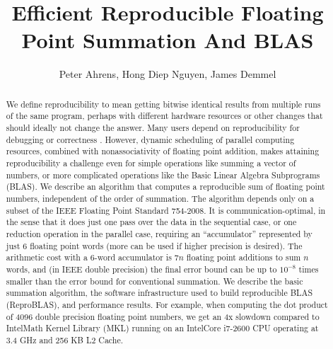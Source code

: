\documentclass[12pt]{article}
\author{Peter Ahrens, Hong Diep Nguyen, James Demmel}
\title{Efficient Reproducible Floating Point Summation And BLAS}
\theoremstyle{definition}
\numberwithin{equation}{section}
\numberwithin{figure}{section}
\begin{document}
\noindent
\maketitle
\begin{abstract}
We define reproducibility to mean getting bitwise identical results from
multiple runs of the same program, perhaps with different hardware resources or other
changes that should ideally not change the answer. Many users depend on reproducibility
for debugging or correctness \cite{reproducibilityBOF}. However, dynamic scheduling of parallel computing
resources, combined with nonassociativity of floating point addition, makes attaining
reproducibility a challenge even for simple operations like summing a vector of numbers,
or more complicated operations like the Basic Linear Algebra Subprograms (BLAS).
We describe an algorithm that computes a reproducible sum of floating point numbers,
independent of the order of summation. The algorithm depends only on a subset of
the IEEE Floating Point Standard 754-2008. It is communication-optimal, in the sense that
it does just one pass over the data in the sequential case, or one reduction operation in
the parallel case, requiring an ``accumulator'' represented by just 6 floating point words
(more can be used if higher precision is desired). The arithmetic cost with a 6-word
accumulator is $7n$ floating point additions to sum $n$ words, and (in IEEE double precision) the
final error bound can be up to $10^{-8}$ times smaller than the error bound for conventional
summation. We describe the basic summation algorithm, the software infrastructure used to
build reproducible BLAS (ReproBLAS), and performance results. For example, when computing the dot product of 4096 double precision floating point numbers, we get an
4x slowdown compared to Intel\textregistered Math Kernel Library (MKL) running on an Intel\textregistered Core i7-2600 CPU operating at 3.4 GHz and 256 KB L2 Cache.
\end{abstract}
\newpage
\tableofcontents
\newpage












\end{document}
